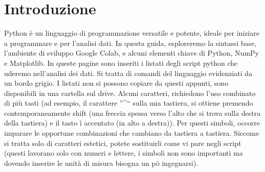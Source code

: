 \section{Introduzione}
Python è un linguaggio di programmazione versatile e potente, ideale per iniziare a programmare e per l'analisi dati. In questa guida, esploreremo la sintassi base, l'ambiente di sviluppo Google Colab, e alcuni elementi chiave di Python, NumPy e Matplotlib. In queste pagine sono inseriti i listati degli script python che uderemo nell'analisi dei dati. Si tratta di comandi del linguaggio  evidenziati da un bordo grigio. I listati non si possono copiare da questi appunti, sono disponibili in una cartella sul drive. Alcuni caratteri, richiedono l'uso combinato di più tasti (ad esempio, il carattere ''\textasciicircum`` sulla mia tastiera, si ottiene premendo contemporaneamente shift (una freccia spessa verso l'alto che si trova sulla destra della tastiera) e il tasto ì accentato (in alto a destra)). Per questi simboli, occorre imparare le opportune combinazioni che cambiano da tastiera a tastiera. Siccome si tratta solo di caratteri estetici, potete sostituirli come vi pare negli script (questi lavorano solo con numeri e lettere, i simboli non sono importanti ma dovendo inserire le unità di misura bisogna un pò ingegnarsi).
 
